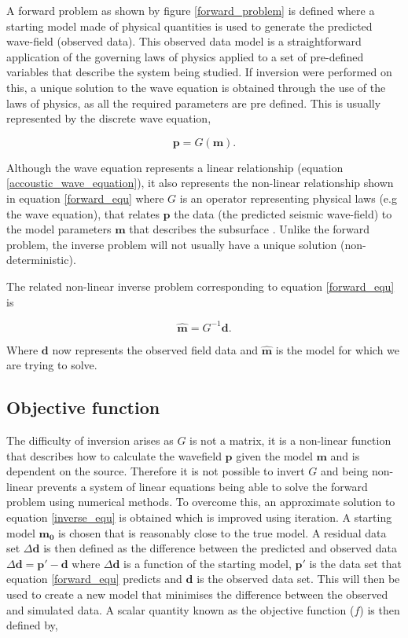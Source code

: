 A forward problem as shown by figure \ref{forward_problem} is defined where a starting model made of physical quantities is used to generate the predicted wave-field (observed data). This observed data model is a straightforward application of the governing laws of physics applied to a set of pre-defined variables that describe the system being studied\citep{guasch20123d}. If inversion were performed on this, a unique solution to the wave equation is obtained through the use of the laws of physics, as all the required parameters are pre defined. 
This is usually represented by the discrete wave equation, 

\begin{equation} 
\textbf{p} = G(\textbf{m}).
\label{forward_equ}
\end{equation}

Although the wave equation represents a linear relationship (equation \ref{accoustic_wave_equation}), it also represents the non-linear relationship shown in equation \ref{forward_equ} where $G$ is an operator representing physical laws (e.g the wave equation), that relates $\textbf{p}$ the data (the predicted seismic wave-field) to the model parameters $\textbf{m}$ that describes the subsurface \citep{warner2013anisotropic}. Unlike the forward problem, the inverse problem will not usually have a unique solution (non-deterministic). \par
The related non-linear inverse problem corresponding to equation \ref{forward_equ} is 

\begin{equation}
\hat{\textbf{m}} = G^{-1}\textbf{d}. 
\label{inverse_equ}
\end{equation}

Where $\textbf{d}$ now represents the observed field data and $\hat{\textbf{m}}$ is the model for which we are trying to solve. 

\subsection{Objective function}
The difficulty of inversion arises as $G$ is not a matrix, it is a non-linear function that describes how to calculate the wavefield $\textbf{p}$ given the model $\textbf{m}$ and is dependent on the source. Therefore it is not possible to invert $G$ and being non-linear prevents a system of linear equations being able to solve the forward problem using numerical methods. To overcome this, an approximate solution to equation \ref{inverse_equ} is obtained which is improved using iteration. A starting model $\mathbf{m_{0}}$ is chosen that is reasonably close to the true model. A residual data set $\Delta \textbf{d}$ is then defined as the difference between the predicted and observed data $\Delta \textbf{d} = \textbf{p} \prime - \textbf{d}$ where $\Delta \textbf{d}$ is a function of the starting model, $\textbf{p} \prime$ is the data set that equation \ref{forward_equ} predicts and $\textbf{d}$ is the observed data set. This will then be used to create a new model that minimises the difference between the observed and simulated data. A scalar quantity known as the  objective function ($f$) is then defined by, 

